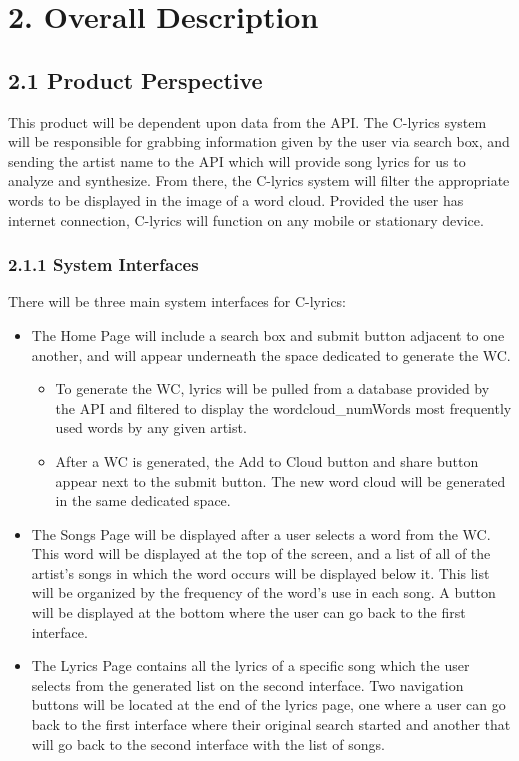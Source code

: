 \documentclass[]{article}
\begin{document}
\section{2. Overall Description}\label{overall-description}

\subsection{2.1 Product Perspective}\label{product-perspective}

This product will be dependent upon data from the API. The C-lyrics
system will be responsible for grabbing information given by the user
via search box, and sending the artist name to the API which will
provide song lyrics for us to analyze and synthesize. From there, the
C-lyrics system will filter the appropriate words to be displayed in the
image of a word cloud. Provided the user has internet connection,
C-lyrics will function on any mobile or stationary device.

\subsubsection{2.1.1 System Interfaces}\label{system-interfaces}

There will be three main system interfaces for C-lyrics:

\begin{itemize}
\item
  The Home Page will include a search box and submit button adjacent to
  one another, and will appear underneath the space dedicated to
  generate the WC.

  \begin{itemize}
  \itemsep1pt\parskip0pt
  \item
    To generate the WC, lyrics will be pulled from a database provided
    by the API and filtered to display the wordcloud\_numWords most
    frequently used words by any given artist.
  \item
    After a WC is generated, the Add to Cloud button and share button
    appear next to the submit button. The new word cloud will be
    generated in the same dedicated space.
  \end{itemize}
\item
  The Songs Page will be displayed after a user selects a word from the
  WC. This word will be displayed at the top of the screen, and a list
  of all of the artist's songs in which the word occurs will be
  displayed below it. This list will be organized by the frequency of
  the word's use in each song. A button will be displayed at the bottom
  where the user can go back to the first interface.
\item
  The Lyrics Page contains all the lyrics of a specific song which the
  user selects from the generated list on the second interface. Two
  navigation buttons will be located at the end of the lyrics page, one
  where a user can go back to the first interface where their original
  search started and another that will go back to the second interface
  with the list of songs.
\end{itemize}
\end{document}
